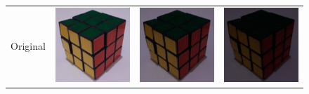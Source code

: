 \begin{figure}
    \centering
    \setlength{\rubiklength}{3cm}
    \begin{tabular}{rccc}
         Original &
         \includegraphics[width=\rubiklength]{img/rubik/1_orig.jpg} & 
         \includegraphics[width=\rubiklength]{img/rubik/2_orig.jpg} & \includegraphics[width=\rubiklength]{img/rubik/3_orig.jpg}\\
         

\end{tabular}
\end{figure}
